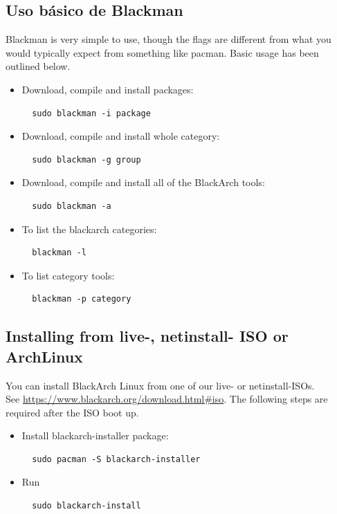 \documentclass[a4paper, oneside, 11pt]{book}
\begin{document}
\subsection{Uso b\'asico de Blackman} Blackman is very simple to use, though the flags are different from what you
would typically expect from something like pacman. Basic usage has been outlined below.
\begin{itemize}
\item Download, compile and install packages:
\begin{lstlisting}
  sudo blackman -i package
\end{lstlisting}

\item Download, compile and install whole category:
\begin{lstlisting}
  sudo blackman -g group
\end{lstlisting}

\item Download, compile and install all of the BlackArch tools:
\begin{lstlisting}
  sudo blackman -a
\end{lstlisting}

\item To list the blackarch categories:
\begin{lstlisting}
  blackman -l
\end{lstlisting}

\item To list category tools:
\begin{lstlisting}
  blackman -p category
\end{lstlisting}

\end{itemize}

\subsection{Installing from live-, netinstall- ISO or ArchLinux}
You can install BlackArch Linux from one of our live- or netinstall-ISOs.\\See
\url{https://www.blackarch.org/download.html#iso}. The following steps are
required after the ISO boot up.
\begin{itemize}
\item Install blackarch-installer package:
\begin{lstlisting}
  sudo pacman -S blackarch-installer
\end{lstlisting}

\item Run
\begin{lstlisting}
  sudo blackarch-install
\end{lstlisting}

\end{itemize}
\end{document}
